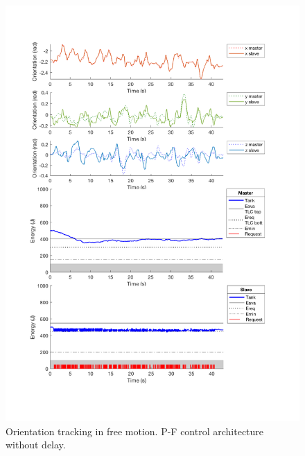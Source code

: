 \begin{center}
	\begin{figure}
		\includegraphics[width=\textwidth, keepaspectratio]{plots/pfFree/Orientation.pdf}
		\caption{Orientation tracking in free motion. P-F control architecture without delay.}
		\label{graph:pfFree/Orientation}
	\end{figure}
\end{center}
